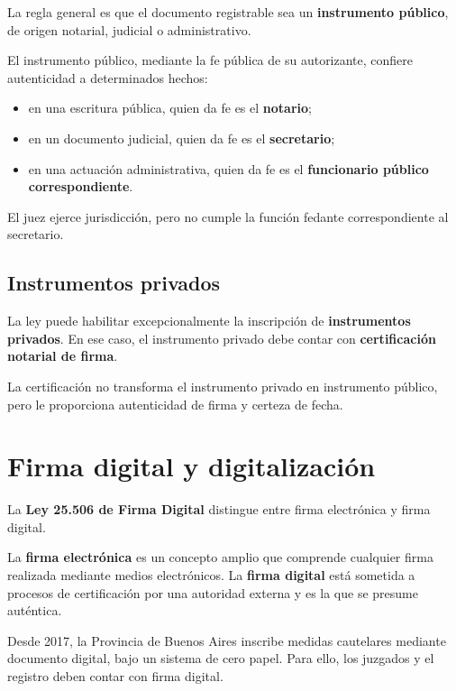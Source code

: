 \documentclass[12pt,oneside]{book}
\begin{document}
La regla general es que el documento registrable sea un \textbf{instrumento público}, de origen notarial, judicial o administrativo.

El instrumento público, mediante la fe pública de su autorizante, confiere autenticidad a determinados hechos:

\begin{itemize}
    \item en una escritura pública, quien da fe es el \textbf{notario};
    \item en un documento judicial, quien da fe es el \textbf{secretario};
    \item en una actuación administrativa, quien da fe es el \textbf{funcionario público correspondiente}.
\end{itemize}

El juez ejerce jurisdicción, pero no cumple la función fedante correspondiente al secretario.

\subsection{Instrumentos privados}

La ley puede habilitar excepcionalmente la inscripción de \textbf{instrumentos privados}. En ese caso, el instrumento privado debe contar con \textbf{certificación notarial de firma}.

La certificación no transforma el instrumento privado en instrumento público, pero le proporciona autenticidad de firma y certeza de fecha.

\section{Firma digital y digitalización}

\begin{important}
La \textbf{Ley 25.506 de Firma Digital} distingue entre firma electrónica y firma digital.

La \textbf{firma electrónica} es un concepto amplio que comprende cualquier firma realizada mediante medios electrónicos. La \textbf{firma digital} está sometida a procesos de certificación por una autoridad externa y es la que se presume auténtica.
\end{important}

Desde 2017, la Provincia de Buenos Aires inscribe medidas cautelares mediante documento digital, bajo un sistema de cero papel. Para ello, los juzgados y el registro deben contar con firma digital.
\end{document}
